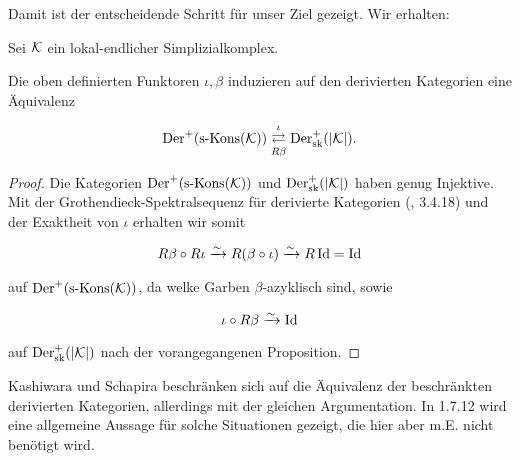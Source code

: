 Damit ist der entscheidende Schritt für unser Ziel gezeigt. Wir
erhalten:

\begin{theorem}
  Sei $\mathcal{K}$ ein lokal-endlicher Simplizialkomplex. %

  Die oben definierten Funktoren $\iota, \beta$ induzieren auf den
  derivierten Kategorien eine Äquivalenz

  \[ \operatorname{Der}^+(\operatorname{s-Kons}(\mathcal{K})) \mathrel{\mathop{\rightleftarrows}^{\iota}_{R \beta}} \operatorname{Der}^+_{\mathrm{sk}}(|\mathcal{K}|). \]
\end{theorem}
\begin{proof}
  Die Kategorien $\operatorname{Der}^+(\operatorname{s-Kons}(\mathcal{K}))$ und $\operatorname{Der}^+_{\mathrm{sk}}(|\mathcal{K}|)$ haben genug
  Injektive.  Mit der Grothendieck-Spektralsequenz für derivierte
  Kategorien (\cite{TD}, 3.4.18) und der Exaktheit von $\iota$
  erhalten wir somit

  \[ R\beta \circ R\iota \xrightarrow{\sim} R(\beta \circ \iota) \xrightarrow{\sim} R \operatorname{Id} = \operatorname{Id} \]

  auf $\operatorname{Der}^+(\operatorname{s-Kons}(\mathcal{K}))$, da welke Garben $\beta$-azyklisch sind, sowie

  \[ \iota \circ R \beta \xrightarrow{\sim} \operatorname{Id} \]

  auf $\operatorname{Der}^+_{\mathrm{sk}}(|\mathcal{K}|)$ nach der vorangegangenen Proposition.
\end{proof}
\begin{bem}
  Kashiwara und Schapira beschränken sich auf die Äquivalenz der
  beschränkten derivierten Kategorien, allerdings mit der gleichen
  Argumentation. In \cite{KS} 1.7.12 wird eine allgemeine Aussage für
  solche Situationen gezeigt, die hier aber m.E. nicht benötigt wird.
\end{bem}


